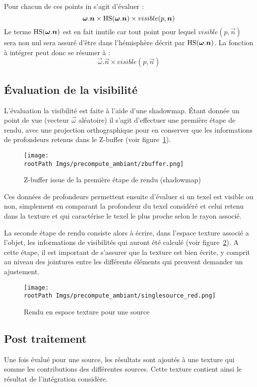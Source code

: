 \documentclass[10pt,a4paper,twoside, twocolumn]{report}
\newcommand*{\rootPath}{../}
\begin{document}
Pour chacun de ces points in s’agit d'évaluer :
	$$\vec\omega.\vec n\times \Hs(\vec \omega.\vec n)\times visible(p, \vec n)$$
Le terme $\Hs(\vec \omega.\vec n)$ est en fait inutile car tout point pour lequel $visible(p, \vec n)$ sera non nul sera assuré d’être dans l’hémisphère décrit par $\Hs(\vec \omega.\vec n)$. La fonction à intégrer peut donc se résumer à :
	$$\vec\omega.\vec n\times visible(p, \vec n)$$

\subsection{Évaluation de la visibilité}
L'évaluation la visibilité est faite à l'aide d'une shadowmap. Étant donnée un point de vue (vecteur $\vec\omega$ aléatoire) il s’agit d’effectuer une première étape de rendu, avec une projection orthographique pour en conserver que les informations de profondeurs retenus dans le Z-buffer (voir figure~\ref{fig:precompute_ambiant:zbuffer}).

\begin{figure}[!ht]\centering
	\texttt{[image: \\rootPath Imgs/precompute\_ambiant/zbuffer.png]}
	\caption{Z-buffer issue de la première étape de rendu (shadowmap)}
	\label{fig:precompute_ambiant:zbuffer}
\end{figure}


Ces données de profondeurs permettent ensuite d'évaluer si un texel est visible ou non, simplement en comparant la profondeur du texel considéré et celui retenu dans la texture et qui caractérise le texel le plus proche selon le rayon associé.

La seconde étape de rendu consiste alors à écrire, dans l’espace texture associé a l'objet, les informations de visibilités qui auront été calculé (voir figure~\ref{fig:precompute_ambiant:singlesource}). A cette étape, il est important de s'assurer que la texture est bien écrite, y comprit au niveau des jointures entre les différents éléments qui preuvent demander un ajustement.\cite{Aila2005}\cite{Manson2012}

\begin{figure}[!ht]\centering
	\texttt{[image: \\rootPath Imgs/precompute\_ambiant/singlesource\_red.png]}
	\caption{Rendu en espace texture pour une source}
	\label{fig:precompute_ambiant:singlesource}
\end{figure}

\subsection{Post traitement}
Une fois évalué pour une source, les résultats sont ajoutés à une texture qui somme les contributions des différentes sources. Cette texture contient ainsi le résultat de l'intégration considère.
\end{document}
